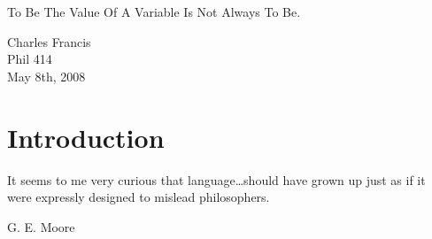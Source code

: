 \documentclass[12pt,letterpaper]{article}
\begin{document}
\begin{minipage}{0.5\textwidth}
\begin{flushleft}
\large{To Be The Value Of A Variable Is Not Always To Be.}\\
\end{flushleft}
\end{minipage}
\begin{minipage}{0.5\textwidth}
\begin{flushright}
Charles Francis \\
Phil 414 \\
May 8th, 2008
\end{flushright}
\end{minipage}

\section{Introduction}
\epigraph{
  It seems to me very curious that language\ldots should have grown up
  just as if it were expressly designed to mislead philosophers.}%
  {G. E. Moore \cite[p.217]{moore}}
\end{document}
